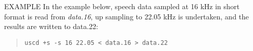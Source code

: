 \begin{qsection}{EXAMPLE}
In the example below, speech data sampled at 16 kHz in short format
is read from {\em data.16}, up sampling to 22.05 kHz is undertaken,
and the results are written to {data.22}:
\begin{quote}
\verb!uscd +s -s 16 22.05 < data.16 > data.22!
\end{quote}
\end{qsection}



